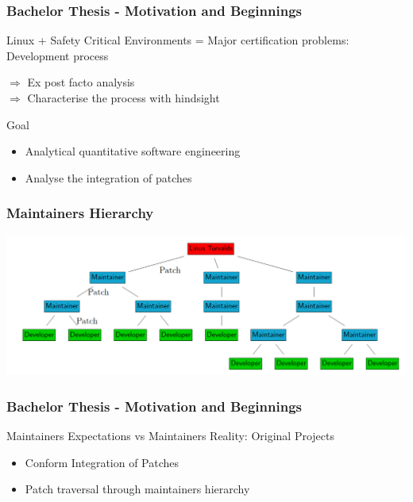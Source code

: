 \documentclass{beamer}
\begin{document}

	\begin{frame}
	\frametitle{Bachelor Thesis - Motivation and Beginnings}
		\begin{block}{Linux + Safety Critical Environments}
			= Major certification problems: Development process
		\end{block}
		$\Rightarrow$ Ex post facto analysis\\ 
		$\Rightarrow$ Characterise the process with hindsight

		\begin{alertblock}{Goal}
			\begin{itemize}
				\item Analytical quantitative software engineering
				\item Analyse the integration of patches
			\end{itemize}
		\end{alertblock}
	\end{frame}

	

	\begin{frame}
	\frametitle{Maintainers Hierarchy}
     		\includegraphics[width=1.0\textwidth]{pics/maintainers_hierarchy.png}
	\end{frame}



	\begin{frame}
	\frametitle{Bachelor Thesis - Motivation and Beginnings}
		\begin{block}{Maintainers Expectations vs Maintainers Reality: Original Projects}
			\begin{itemize}
				\item Conform Integration of Patches
				\item Patch traversal through maintainers hierarchy
			\end{itemize}
		\end{block}
	\end{frame}
\end{document}
